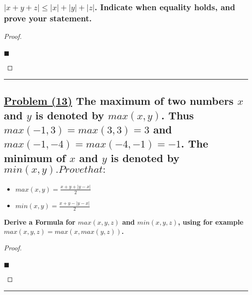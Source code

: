\documentclass[letterpaper, 10 pt, conference]{ieeeconf}  %
\begin{document}
\subsubsection{\textbf{$\left\lvert x + y + z \right\rvert \leq \left\lvert x \right\rvert + \left\lvert y \right\rvert + \left\lvert z \right\rvert$. Indicate when equality holds, and prove your statement.}}
\begin{proof}
\begin{align}
    
\end{align}
\begin{flushright}
$\blacksquare$
\end{flushright}
\end{proof}

\noindent\rule{8cm}{0.4pt}
\subsection{\textbf{\underline{Problem (13)} The maximum of two numbers $x$ and $y$ is denoted by $max(x,y)$. Thus $max(-1,3) = max (3,3) = 3$ and $max(-1,-4) = max(-4,-1) = -1$. The minimum of $x$ and $y$ is denoted by $min(x,y). Prove that:$}}

\begin{center}
    \begin{itemize}
        \item $max(x,y) = \frac{x + y + \left\lvert y - x \right\rvert}{2}$
        \item $min(x,y) = \frac{x + y - \left\lvert y - x \right\rvert}{2}$
    \end{itemize}
\end{center}

\textbf{Derive a Formula for $max(x,y,z)$ and $min(x,y,z)$, using for example $max(x,y,z) = max(x,max(y,z))$.} 

\begin{proof}
\begin{align}
    
\end{align}
\begin{flushright}
$\blacksquare$
\end{flushright}
\end{proof}

\noindent\rule{8cm}{0.4pt}
\end{document}
